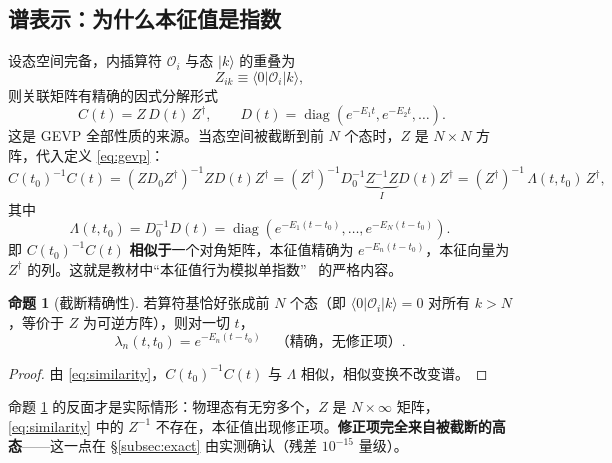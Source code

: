 \documentclass[12pt,a4paper]{ctexart}
\theoremstyle{definition}
\newtheorem{proposition}{命题}[section]
\newcommand{\dagg}{\dagger}
\begin{document}
\subsection{谱表示：为什么本征值是指数}

设态空间完备，内插算符 $\mathcal{O}_i$ 与态 $|k\rangle$ 的重叠为
\begin{equation}
Z_{ik} \equiv \langle 0|\mathcal{O}_i|k\rangle ,
\end{equation}
则关联矩阵有精确的因式分解形式
\begin{equation}
\boxed{\;C(t) = Z\, D(t)\, Z^\dagg , \qquad D(t) = \operatorname{diag}\!\left(e^{-E_1 t}, e^{-E_2 t}, \dots\right).}
\label{eq:factorization}
\end{equation}
这是 GEVP 全部性质的来源。当态空间被截断到前 $N$ 个态时，$Z$ 是 $N\times N$ 方阵，代入定义 \eqref{eq:gevp}：
\begin{equation}
C(t_0)^{-1}C(t) = \left(Z D_0 Z^\dagg\right)^{-1} Z D(t) Z^\dagg
= (Z^\dagg)^{-1} D_0^{-1} \underbrace{Z^{-1} Z}_{I} D(t) Z^\dagg
= (Z^\dagg)^{-1}\, \Lambda(t,t_0)\, Z^\dagg ,
\label{eq:similarity}
\end{equation}
其中
\begin{equation}
\Lambda(t,t_0) = D_0^{-1}D(t) = \operatorname{diag}\!\left(e^{-E_1(t-t_0)},\dots,e^{-E_N(t-t_0)}\right).
\end{equation}
即 $C(t_0)^{-1}C(t)$ \textbf{相似于}一个对角矩阵，本征值精确为 $e^{-E_n(t-t_0)}$，本征向量为 $Z^\dagg$ 的列。这就是教材中``本征值行为模拟单指数''~\cite{GattringerLang2010} 的严格内容。

\begin{proposition}[截断精确性]\label{prop:exact}
若算符基恰好张成前 $N$ 个态（即 $\langle 0|\mathcal{O}_i|k\rangle = 0$ 对所有 $k>N$，等价于 $Z$ 为可逆方阵），则对一切 $t$，
\begin{equation}
\lambda_n(t,t_0) = e^{-E_n(t-t_0)} \quad \text{（精确，无修正项）}.
\end{equation}
\end{proposition}

\begin{proof}
由 \eqref{eq:similarity}，$C(t_0)^{-1}C(t)$ 与 $\Lambda$ 相似，相似变换不改变谱。
\end{proof}

命题 \ref{prop:exact} 的反面才是实际情形：物理态有无穷多个，$Z$ 是 $N\times\infty$ 矩阵，\eqref{eq:similarity} 中的 $Z^{-1}$ 不存在，本征值出现修正项。\textbf{修正项完全来自被截断的高态}——这一点在 §\ref{subsec:exact} 由实测确认（残差 $10^{-15}$ 量级）。
\end{document}

